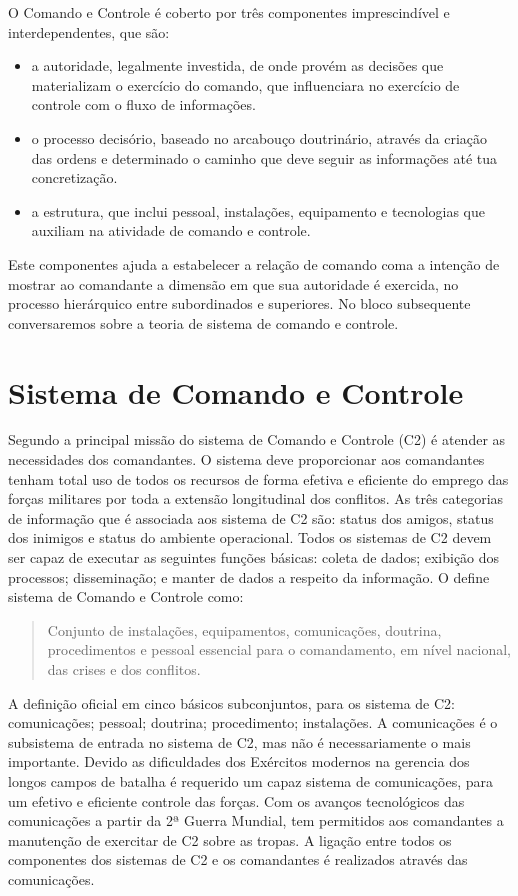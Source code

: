 \hspace{1.5cm}
O Comando e Controle é coberto por três componentes  imprescindível e interdependentes, que são:
\begin{itemize}
    \item a autoridade, legalmente investida, de onde provém as decisões que materializam o exercício do comando, que influenciara no exercício de controle com o fluxo de informações.
    \item o processo decisório, baseado no arcabouço doutrinário, através da criação das ordens e determinado o caminho que deve seguir as informações até tua concretização.
    \item a estrutura, que inclui pessoal, instalações, equipamento e tecnologias que auxiliam na atividade de comando e controle.
\end{itemize}
Este componentes ajuda a estabelecer a relação de comando coma a intenção de mostrar ao comandante a dimensão em que sua autoridade é exercida, no processo hierárquico entre subordinados e superiores. No bloco subsequente conversaremos sobre a teoria de sistema de comando e controle. 

\section*{Sistema de Comando e Controle}
\hspace{1.5cm}
Segundo \cite{thesecommandandcontrol} a  principal missão do sistema de Comando e Controle (C2) é atender as necessidades dos comandantes. O sistema deve proporcionar aos comandantes tenham total uso de todos os recursos de forma efetiva e eficiente do emprego das forças militares por toda a extensão longitudinal dos conflitos. As três categorias de informação que é associada aos sistema de C2 são: status dos amigos, status dos inimigos e status do ambiente operacional. Todos os sistemas de C2 devem ser capaz de executar as seguintes funções básicas: coleta de dados; exibição dos processos; disseminação; e manter de dados a respeito da informação. O \cite{comandoecontrole2015} define sistema de Comando e Controle como: 
\begin{quote}
    Conjunto de instalações, equipamentos, comunicações, doutrina, procedimentos e pessoal essencial para o comandamento, em nível nacional, das crises e dos conflitos.
\end{quote}

\hspace{1.5cm}
A definição oficial em cinco básicos subconjuntos, para os sistema de C2: comunicações; pessoal;  doutrina; procedimento; instalações. A comunicações é o subsistema de entrada no sistema de C2, mas não é necessariamente o mais importante. Devido as  dificuldades dos Exércitos modernos na gerencia dos longos campos de batalha é requerido um capaz sistema de comunicações, para um efetivo e eficiente controle das forças. Com os avanços tecnológicos das comunicações a partir da 2ª Guerra Mundial, tem permitidos aos comandantes a manutenção de exercitar de C2 sobre as tropas. A ligação entre todos os componentes dos sistemas de C2 e os comandantes é realizados através das comunicações.

